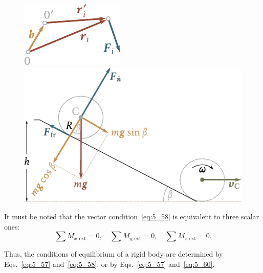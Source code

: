 \begin{figure}[t]
	\begin{minipage}[t]{0.27\linewidth}
		\begin{center}
			\includegraphics[scale=1]{figures/ch_05/fig_5_21.pdf}
			\caption[]{}
			\label{fig:5_21}
		\end{center}
	\end{minipage}
	\hspace{-0.05cm}
	\begin{minipage}[t]{0.7\linewidth}
		\begin{center}
			\includegraphics[scale=1]{figures/ch_05/fig_5_22.pdf}
			\caption[]{}
			\label{fig:5_22}
		\end{center}
	\end{minipage}
	\vspace{-0.7cm}
\end{figure}

It must be noted that the vector condition~\eqref{eq:5_58} is equivalent to three scalar ones:
\begin{equation}\label{eq:5_60}
	\sum M_{x,\text{ext}} = 0 ,\quad \sum M_{y,\text{ext}} = 0 ,\quad \sum M_{z,\text{ext}} = 0.
\end{equation}

Thus, the conditions of equilibrium of a rigid body are determined by Eqs.~\eqref{eq:5_57} and~\eqref{eq:5_58}, or by Eqs.~\eqref{eq:5_57} and~\eqref{eq:5_60}.


